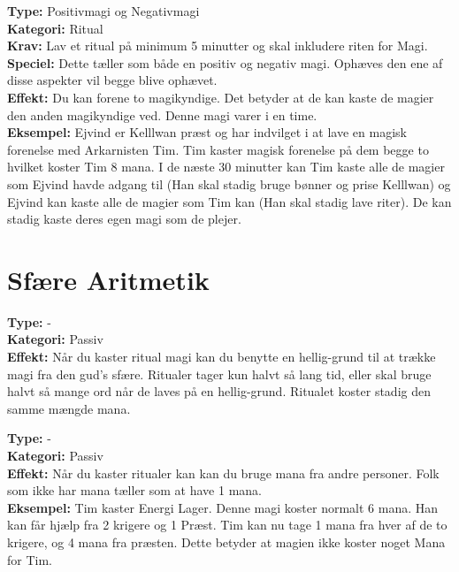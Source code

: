 \begin{mesterMagi*}
\textbf{Type:} Positivmagi og Negativmagi \\
\textbf{Kategori:} Ritual\\
\textbf{Krav:} Lav et ritual på minimum 5 minutter og skal inkludere riten for Magi.
\textbf{Speciel:} Dette tæller som både en positiv og negativ magi. Ophæves den ene af disse aspekter vil begge blive ophævet.\\
\textbf{Effekt:} Du kan forene to magikyndige. Det betyder at de kan kaste de magier den anden magikyndige ved. Denne magi varer i en time.\\
\textbf{Eksempel:} Ejvind er Kelllwan præst og har indvilget i at lave en magisk forenelse med Arkarnisten Tim. Tim kaster magisk forenelse på dem begge to hvilket koster Tim 8 mana. I de næste 30 minutter kan Tim kaste alle de magier som Ejvind havde adgang til (Han skal stadig bruge bønner og prise Kelllwan) og Ejvind kan kaste alle de magier som Tim kan (Han skal stadig lave riter). De kan stadig kaste deres egen magi som de plejer.
\end{mesterMagi*}

\section{Sfære Aritmetik}
\begin{sAritMagi*}
\textbf{Type:} - \\
\textbf{Kategori:} Passiv\\ 
\textbf{Effekt:} Når du kaster ritual magi kan du benytte en hellig-grund til at trække magi fra den gud’s sfære. Ritualer tager kun halvt så lang tid, eller skal bruge halvt så mange ord når de laves på en hellig-grund. Ritualet koster stadig den samme mængde mana.
\end{sAritMagi*}

\begin{sAritMagi*}
\textbf{Type:} -\\
\textbf{Kategori:} Passiv\\
\textbf{Effekt:} Når du kaster ritualer kan kan du bruge mana fra andre personer. Folk som ikke har mana tæller som at have 1 mana.\\
\textbf{Eksempel:} Tim kaster Energi Lager. Denne magi koster normalt 6 mana. Han kan får hjælp fra 2 krigere og 1 Præst. Tim kan nu tage 1 mana fra hver af de to krigere, og 4 mana fra præsten. Dette betyder at magien ikke koster noget Mana for Tim.
\end{sAritMagi*}

